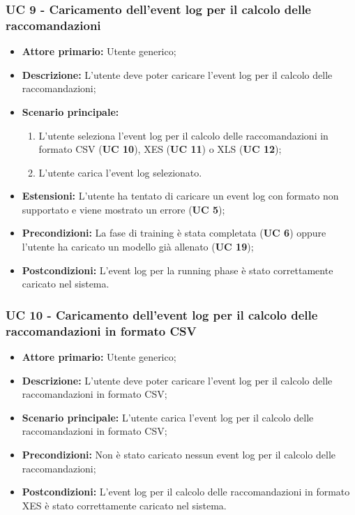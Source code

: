 \subsubsection{UC 9 - Caricamento dell'event log per il calcolo delle raccomandazioni}
\begin{itemize}
	\item \textbf{Attore primario:} Utente generico;
	\item \textbf{Descrizione:} L'utente deve poter caricare l'event log per il calcolo delle raccomandazioni;
	\item \textbf{Scenario principale:} 
		\begin{enumerate}
			\item L'utente seleziona l'event log per il calcolo delle raccomandazioni in formato CSV (\textbf{UC 10}), XES (\textbf{UC 11}) o XLS (\textbf{UC 12});
			\item L'utente carica l'event log selezionato.
		\end{enumerate}
	\item \textbf{Estensioni:} L'utente ha tentato di caricare un event log con formato non supportato e viene mostrato un errore (\textbf{UC 5});
		
	\item \textbf{Precondizioni:} La fase di training è stata completata (\textbf{UC 6}) oppure l'utente ha caricato un modello già allenato (\textbf{UC 19});
	\item \textbf{Postcondizioni:} L'event log per la running phase è stato correttamente caricato nel sistema.
\end{itemize}

\subsubsection{UC 10 - Caricamento dell'event log per il calcolo delle raccomandazioni in formato CSV}
\begin{itemize}
	\item \textbf{Attore primario:} Utente generico;
	\item \textbf{Descrizione:} L'utente deve poter caricare l'event log per il calcolo delle raccomandazioni in formato CSV;
	\item \textbf{Scenario principale:} L'utente carica l'event log per il calcolo delle raccomandazioni in formato CSV;
	\item \textbf{Precondizioni:} Non è stato caricato nessun event log per il calcolo delle raccomandazioni;
	\item \textbf{Postcondizioni:} L'event log per il calcolo delle raccomandazioni in formato XES è stato correttamente caricato nel sistema.
\end{itemize}

